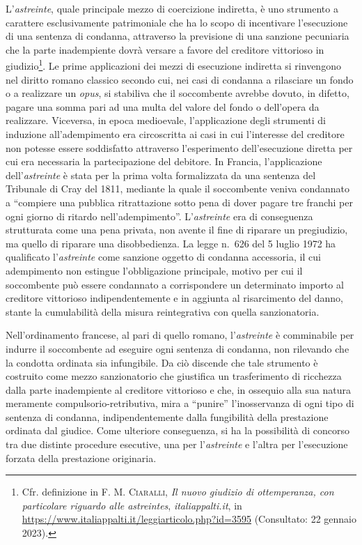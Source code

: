 \documentclass[12pt,it,a4paper,]{report}
\begin{document}
L'\emph{astreinte}, quale principale mezzo di coercizione indiretta, è
uno strumento a carattere esclusivamente patrimoniale che ha lo scopo di
incentivare l'esecuzione di una sentenza di condanna, attraverso la
previsione di una sanzione pecuniaria che la parte inadempiente dovrà
versare a favore del creditore vittorioso in giudizio\footnote{Cfr.
  definizione in F. M. \textsc{Ciaralli}, \emph{Il nuovo giudizio di
  ottemperanza, con particolare riguardo alle astreintes},
  \emph{italiappalti.it}, in
  \url{https://www.italiappalti.it/leggiarticolo.php?id=3595}
  (Consultato: 22 gennaio 2023).}. Le prime applicazioni dei mezzi di
esecuzione indiretta si rinvengono nel diritto romano classico secondo
cui, nei casi di condanna a rilasciare un fondo o a realizzare un
\emph{opus}, si stabiliva che il soccombente avrebbe dovuto, in difetto,
pagare una somma pari ad una multa del valore del fondo o dell'opera da
realizzare. Viceversa, in epoca medioevale, l'applicazione degli
strumenti di induzione all'adempimento era circoscritta ai casi in cui
l'interesse del creditore non potesse essere soddisfatto attraverso
l'esperimento dell'esecuzione diretta per cui era necessaria la
partecipazione del debitore. In Francia, l'applicazione
dell'\emph{astreinte} è stata per la prima volta formalizzata da una
sentenza del Tribunale di Cray del 1811, mediante la quale il
soccombente veniva condannato a ``compiere una pubblica ritrattazione
sotto pena di dover pagare tre franchi per ogni giorno di ritardo
nell'adempimento''. L'\emph{astreinte} era di conseguenza strutturata
come una pena privata, non avente il fine di riparare un pregiudizio, ma
quello di riparare una disobbedienza. La legge n.~626 del 5 luglio 1972
ha qualificato l'\emph{astreinte} come sanzione oggetto di condanna
accessoria, il cui adempimento non estingue l'obbligazione principale,
motivo per cui il soccombente può essere condannato a corrispondere un
determinato importo al creditore vittorioso indipendentemente e in
aggiunta al risarcimento del danno, stante la cumulabilità della misura
reintegrativa con quella sanzionatoria.

Nell'ordinamento francese, al pari di quello romano, l'\emph{astreinte}
è comminabile per indurre il soccombente ad eseguire ogni sentenza di
condanna, non rilevando che la condotta ordinata sia infungibile. Da ciò
discende che tale strumento è costruito come mezzo sanzionatorio che
giustifica un trasferimento di ricchezza dalla parte inadempiente al
creditore vittorioso e che, in ossequio alla sua natura meramente
compulsorio-retributiva, mira a ``punire'' l'inosservanza di ogni tipo
di sentenza di condanna, indipendentemente dalla fungibilità della
prestazione ordinata dal giudice. Come ulteriore conseguenza, si ha la
possibilità di concorso tra due distinte procedure esecutive, una per
l'\emph{astreinte} e l'altra per l'esecuzione forzata della prestazione
originaria.
\end{document}

